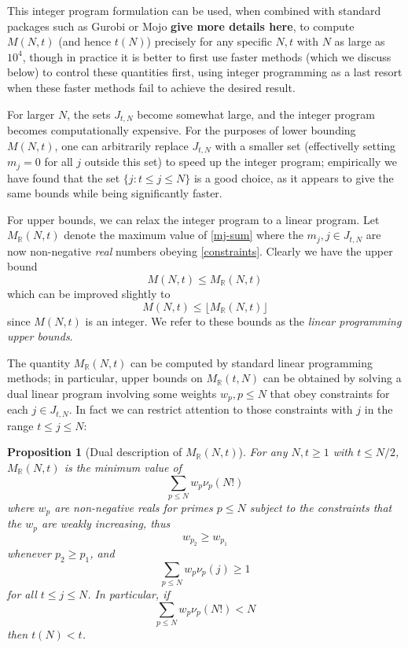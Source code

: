\documentclass[12pt,a4paper,reqno]{amsart}
\numberwithin{equation}{section}
\theoremstyle{plain}
\newtheorem{proposition}[theorem]{Proposition}
\theoremstyle{definition}
\newcommand\R{\mathbb{R}}
\begin{document}
This integer program formulation can be used, when combined with standard packages such as Gurobi or Mojo {\bf give more details here}, to compute $M(N,t)$ (and hence $t(N)$) precisely for any specific $N,t$ with $N$ as large as $10^4$, though in practice it is better to first use faster methods (which we discuss below) to control these quantities first, using integer programming as a last resort when these faster methods fail to achieve the desired result.

For larger $N$, the sets $J_{t,N}$ become somewhat large, and the integer program becomes computationally expensive.  For the purposes of lower bounding $M(N,t)$, one can arbitrarily replace $J_{t,N}$ with a smaller set (effectivelly setting $m_j=0$ for all $j$ outside this set) to speed up the integer program; empirically we have found that the set $\{ j: t \leq j \leq N \}$ is a good choice, as it appears to give the same bounds while being significantly faster.

For upper bounds, we can relax the integer program to a linear program.  Let $M_\R(N,t)$ denote the maximum value of \eqref{mj-sum} where the $m_j, j \in J_{t,N}$ are now non-negative \emph{real} numbers obeying \eqref{constraints}.  Clearly we have the upper bound
$$ M(N,t) \leq M_\R(N,t)$$
which can be improved slightly to
\begin{equation}\label{lp-upper} 
  M(N,t) \leq \lfloor M_\R(N,t)\rfloor
\end{equation}
since $M(N,t)$ is an integer.  We refer to these bounds as the \emph{linear programming upper bounds}.

The quantity $M_\R(N,t)$ can be computed by standard linear programming methods; in particular, upper bounds on $M_\R(t,N)$ can be obtained by solving a dual linear program involving some weights $w_p, p \leq N$ that obey constraints for each $j \in J_{t,N}$.  In fact we can restrict attention to those constraints with $j$ in the range $t \leq j \leq N$:

\begin{proposition}[Dual description of $M_\R(N,t)$]\label{dual-desc} For any $N,t \geq 1$ with $t \leq N/2$, $M_\R(N,t)$ is the minimum value of
\begin{equation}\label{hyp}
    \sum_{p \leq N} w_p \nu_p(N!)
\end{equation}
where $w_p$ are non-negative reals for primes $p \leq N$
subject to the constraints that the $w_p$ are weakly increasing, thus
\begin{equation}\label{wp-decrease}
w_{p_2} \geq w_{p_1}
\end{equation}
whenever $p_2 \geq p_1$, and 
\begin{equation}\label{pj}
  \sum_{p \leq N} w_p \nu_p(j) \geq 1
 \end{equation}
for all $t \leq j \leq N$.  In particular, if
\begin{equation}\label{hyp-low}
  \sum_{p \leq N} w_p \nu_p(N!) < N
\end{equation}
then $t(N) < t$.
\end{proposition}
\end{document}
